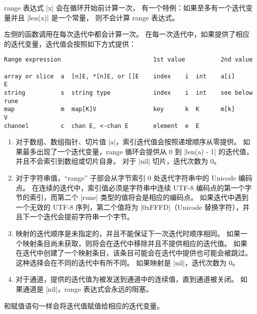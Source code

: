 range 表达式 \code|x| 会在循环开始前计算一次，
有一个特例：如果至多有一个迭代变量并且 \code|len(x)| 是一个常量，
则不会计算 range 表达式。

左侧的函数调用在每次迭代中都会计算一次。
在每一次迭代中，如果提供了相应的迭代变量，迭代值会按照如下方式提供：
\begin{lstlisting}
Range expression                          1st value          2nd value

array or slice  a  [n]E, *[n]E, or []E    index    i  int    a[i]       E
string          s  string type            index    i  int    see below  rune
map             m  map[K]V                key      k  K      m[k]       V
channel         c  chan E, <-chan E       element  e  E
\end{lstlisting}

\begin{enumerate}
\item 对于数组、数组指针、切片值 \code|a|，索引迭代值会按照递增顺序从零提供。
如果最多出现了一个迭代变量，range 循环会提供从 0 到 \code|len(a) - 1| 的迭代值，并且不会索引到数组或切片自身。
对于 \code|nil| 切片，迭代次数为 0。
\item 对于字符串值，``range'' 子部会从字节索引 0 处迭代字符串中的 Unicode 编码点。
在连续的迭代中，索引值必须是字符串中连续 UTF-8 编码点的第一个字节的索引，而第二个 \code|rune| 类型的值将会是相应的编码点。
如果迭代中遇到一个无效的 UTF-8 序列，第二个值将为 \code|0xFFFD|（Unicode 替换字符），并且下一个迭代会提前字符串一个字节。
\item 映射的迭代顺序是未指定的，并且不能保证下一次迭代时顺序相同。
如果一个映射条目尚未获取，则将会在迭代中移除并且不提供相应的迭代值。
如果在迭代中创建了一个映射条目，该条目可能会在迭代中提供也可能会被跳过。
这种选择会在不同的迭代中有所不同。
如果映射是 \code|nil|，迭代次数为 0。
\item 对于通道，提供的迭代值为被发送到通道中的连续值，直到通道被关闭。
如果通道是 \code|nil|，range 表达式会永远的阻塞。
\end{enumerate}

和赋值语句一样会将迭代值赋值给相应的迭代变量。

